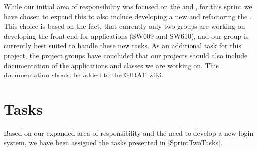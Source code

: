 While our initial area of responsibility was focused on the  and
, for this sprint we have chosen to expand this to
also include developing a new  and refactoring the
. This choice is based on the fact, that currently only
two groups are working on developing the front-end for applications (SW609 and
SW610), and our group is currently best suited to handle these new tasks. As an
additional task for this project, the project groups have concluded that our
projects should also include documentation of the applications and classes we
are working on. This documentation should be added to the GIRAF wiki.

\section{Tasks}
Based on our expanded area of responsibility and the need to develop a new login
system, we have been assigned the tasks presented in \autoref{SprintTwoTasks}.

